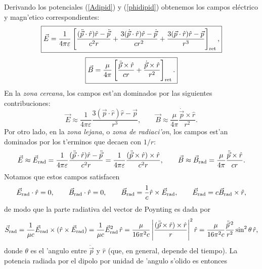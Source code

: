 Derivando los potenciales (\ref{Adipid}) y (\ref{phidipid}) obtenemos los campos eléctrico y magn'etico correspondientes:
\begin{equation}
 \boxed{\vec{E}=\frac{1}{4\pi\varepsilon}\left[\frac{(\ddot{\vec{p}}\cdot\hat{r})\hat{r}-\ddot{\vec{p}}}{c^2r}+\frac{3(\dot{\vec{p}}\cdot\hat{r})\hat{r}-\dot{\vec{p}}}{cr^2}+\frac{3(\vec{p}\cdot\hat{r})\hat{r}-\vec{p}}{r^3}\right]_{\rm ret},}
\end{equation}
\begin{equation}
 \boxed{\vec{B}=\frac{\mu}{4\pi}\left[\frac{\ddot{\vec{p}}\times\hat{r}}{cr}+\frac{\dot{\vec{p}}\times\hat{r}}{r^2}\right]_{\rm ret}.}
\end{equation}
En la \textit{zona cercana}, los campos est'an dominados por las siguientes contribuciones:
\begin{equation}
 \vec{E}\approx\frac{1}{4\pi\varepsilon}\frac{3(\vec{p}\cdot\hat{r})\hat{r}-\vec{p}}{r^3},
\qquad
 \vec{B}\approx\frac{\mu}{4\pi}\frac{\dot{\vec{p}}\times\hat{r}}{r^2}.
\end{equation}
Por otro lado, en la \textit{zona lejana}, o \textit{zona de radiaci'on}, los campos est'an dominados por los t'erminos que decaen con $1/r$:
\begin{equation}
 \vec{E}\approx\vec{E}_{\rm rad}=\frac{1}{4\pi\varepsilon}\frac{(\ddot{\vec{p}}\cdot\hat{r})\hat{r}-\ddot{\vec{p}}}{c^2r}=\frac{1}{4\pi\varepsilon}\frac{(\ddot{\vec{p}}\times\hat{r})\times\hat{r}}{c^2r}, \qquad
 \vec{B}\approx \vec{B}_{\rm rad}=\frac{\mu}{4\pi}\frac{\ddot{\vec{p}}\times\hat{r}}{cr}.
\end{equation}
Notamos que estos campos satisfacen
\begin{equation}
 \vec{E}_{\rm rad}\cdot\hat{r}=0,\qquad  \vec{B}_{\rm rad}\cdot\hat{r}=0,\qquad \vec{B}_{\rm rad}=\frac{1}{c}\hat{r}\times\vec{E}_{\rm rad}, \qquad \vec{E}_{\rm rad}=c\vec{B}_{\rm rad}\times\hat{r},
\end{equation}
de modo que la parte radiativa del vector de Poynting es dada por
\begin{equation}
\vec{S}_{\rm rad}=\frac{1}{\mu c}\vec{E}_{\rm rad}\times(\hat{r}\times\vec{E}_{\rm rad}) 
=\frac{1}{\mu c}\vec{E}_{\rm rad}^2\,\hat{r}= \frac{\mu}{16\pi^2 c}\left|\frac{(\ddot{\vec{p}}\times\hat{r})\times\hat{r}}{r}\right|^2\hat{r} 
=\frac{\mu}{16\pi^2 c}\frac{\ddot{\vec{p}}{\,}^2}{r^2}\sin^2\theta\,\hat{r},
\end{equation}
donde $\theta$ es el 'angulo entre $\ddot{\vec{p}}$ y $\hat{r}$ (que, en general, depende del tiempo). La potencia radiada por el dipolo por unidad de 'angulo s'olido es entonces 
